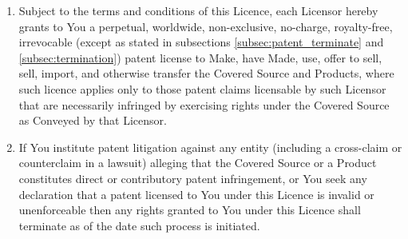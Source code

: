 \documentclass[10pt, a4paper]{article}
\begin{document}
\begin{enumerate}[label=\ref*{sec:patents}.\arabic*]
\item

Subject to the terms and conditions of this Licence, each Licensor hereby grants to You a perpetual, worldwide, non-exclusive, no-charge, royalty-free, irrevocable (except as stated in subsections \ref*{subsec:patent_terminate} and \ref*{subsec:termination}) patent license to Make, have Made, use, offer to sell, sell, import, and otherwise transfer the Covered Source and Products, where such licence applies only to those patent claims licensable by such Licensor that are necessarily infringed by exercising rights under the Covered Source as Conveyed by that Licensor. 
\item
\label{subsec:patent_terminate}
If You institute patent litigation against any entity (including a cross-claim or counterclaim in a lawsuit) alleging that the Covered Source or a Product constitutes direct or contributory patent infringement, or You seek any declaration that a patent licensed to You under this Licence is invalid or unenforceable then any rights granted to You under this Licence shall terminate as of the date such process is initiated.
\end{enumerate}
\end{document}
